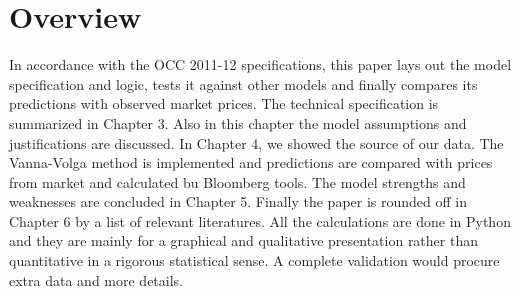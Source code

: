 \chapter{Overview}
In accordance with the OCC 2011-12 specifications, this paper lays out the model specification and logic, tests it against other models and finally compares its predictions with observed market prices. \newline
The technical specification is summarized in Chapter 3. Also in this chapter the model assumptions and justifications are discussed.
In Chapter 4, we showed the source of our data. The Vanna-Volga method is implemented and predictions are compared with prices from market and calculated bu Bloomberg tools.
The model strengths and weaknesses are concluded in Chapter 5. Finally the paper is rounded off in Chapter 6 by a list of relevant literatures. \newline
All the calculations are done in Python and they are mainly for a graphical and qualitative presentation rather than quantitative in a rigorous statistical sense. A complete validation would procure extra data and more details.